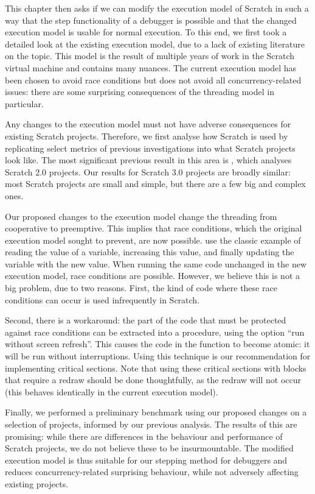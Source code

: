 \documentclass[../main]{subfiles}
\begin{document}
This chapter then asks if we can modify the execution model of Scratch in such a way that the step functionality of a debugger is possible and that the changed execution model is usable for normal execution.
To this end, we first took a detailed look at the existing execution model, due to a lack of existing literature on the topic.
This model is the result of multiple years of work in the Scratch virtual machine and contains many nuances.
The current execution model has been chosen to avoid race conditions but does not avoid all concurrency-related issues: there are some surprising consequences of the threading model in particular.

Any changes to the execution model must not have adverse consequences for existing Scratch projects.
Therefore, we first analyse how Scratch is used by replicating select metrics of previous investigations into what Scratch projects look like.
The most significant previous result in this area is \textcite{aivaloglouHowKidsCode2016}, which analyses Scratch 2.0 projects.
Our results for Scratch 3.0 projects are broadly similar: most Scratch projects are small and simple, but there are a few big and complex ones.

Our proposed changes to the execution model change the threading from cooperative to preemptive.
This implies that race conditions, which the original execution model sought to prevent, are now possible.
\Textcite{maloneyScratchProgrammingLanguage2010} use the classic example of reading the value of a variable, increasing this value, and finally updating the variable with the new value.
When running the same code unchanged in the new execution model, race conditions are possible.
However, we believe this is not a big problem, due to two reasons.
First, the kind of code where these race conditions can occur is used infrequently in Scratch.

Second, there is a workaround: the part of the code that must be protected against race conditions can be extracted into a procedure, using the option ``run without screen refresh''.
This causes the code in the function to become atomic: it will be run without interruptions.
Using this technique is our recommendation for implementing critical sections.
Note that using these critical sections with blocks that require a redraw should be done thoughtfully, as the redraw will not occur (this behaves identically in the current execution model).

Finally, we performed a preliminary benchmark using our proposed changes on a selection of projects, informed by our previous analysis.
The results of this are promising: while there are differences in the behaviour and performance of Scratch projects, we do not believe these to be insurmountable.
The modified execution model is thus suitable for our stepping method for debuggers and reduces concurrency-related surprising behaviour, while not adversely affecting existing projects.
\end{document}
